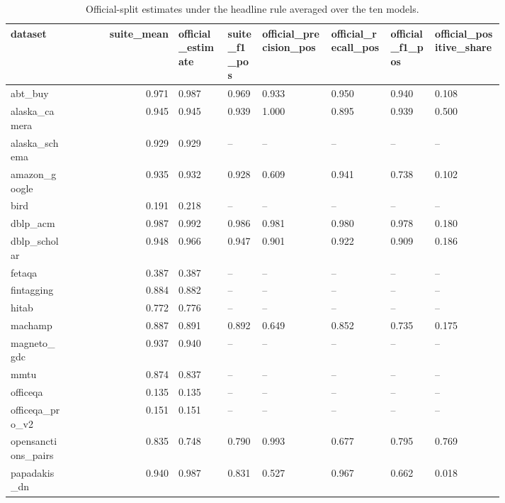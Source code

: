 \begin{table}[htbp]
\centering\tiny
\caption{Official-split estimates under the headline rule averaged over the ten models.}
\label{tab:official_split_by_dataset}
\setlength{\tabcolsep}{3pt}
\begin{tabular}{p{0.121\linewidth}rp{0.108\linewidth}p{0.076\linewidth}p{0.140\linewidth}p{0.121\linewidth}p{0.095\linewidth}p{0.146\linewidth}}
\toprule
dataset & suite\_\allowbreak{}mean & official\_\allowbreak{}estimate & suite\_\allowbreak{}f1\_\allowbreak{}pos & official\_\allowbreak{}precision\_\allowbreak{}pos & official\_\allowbreak{}recall\_\allowbreak{}pos & official\_\allowbreak{}f1\_\allowbreak{}pos & official\_\allowbreak{}positive\_\allowbreak{}share \\
\midrule
abt\_\allowbreak{}buy & 0.971 & 0.987 & 0.969 & 0.933 & 0.950 & 0.940 & 0.108 \\
alaska\_\allowbreak{}camera & 0.945 & 0.945 & 0.939 & 1.000 & 0.895 & 0.939 & 0.500 \\
alaska\_\allowbreak{}schema & 0.929 & 0.929 & -- & -- & -- & -- & -- \\
amazon\_\allowbreak{}google & 0.935 & 0.932 & 0.928 & 0.609 & 0.941 & 0.738 & 0.102 \\
bird & 0.191 & 0.218 & -- & -- & -- & -- & -- \\
dblp\_\allowbreak{}acm & 0.987 & 0.992 & 0.986 & 0.981 & 0.980 & 0.978 & 0.180 \\
dblp\_\allowbreak{}scholar & 0.948 & 0.966 & 0.947 & 0.901 & 0.922 & 0.909 & 0.186 \\
fetaqa & 0.387 & 0.387 & -- & -- & -- & -- & -- \\
fintagging & 0.884 & 0.882 & -- & -- & -- & -- & -- \\
hitab & 0.772 & 0.776 & -- & -- & -- & -- & -- \\
machamp & 0.887 & 0.891 & 0.892 & 0.649 & 0.852 & 0.735 & 0.175 \\
magneto\_\allowbreak{}gdc & 0.937 & 0.940 & -- & -- & -- & -- & -- \\
mmtu & 0.874 & 0.837 & -- & -- & -- & -- & -- \\
officeqa & 0.135 & 0.135 & -- & -- & -- & -- & -- \\
officeqa\_\allowbreak{}pro\_\allowbreak{}v2 & 0.151 & 0.151 & -- & -- & -- & -- & -- \\
opensanctions\_\allowbreak{}pairs & 0.835 & 0.748 & 0.790 & 0.993 & 0.677 & 0.795 & 0.769 \\
papadakis\_\allowbreak{}dn & 0.940 & 0.987 & 0.831 & 0.527 & 0.967 & 0.662 & 0.018 \\

\end{tabular}
\end{table}
